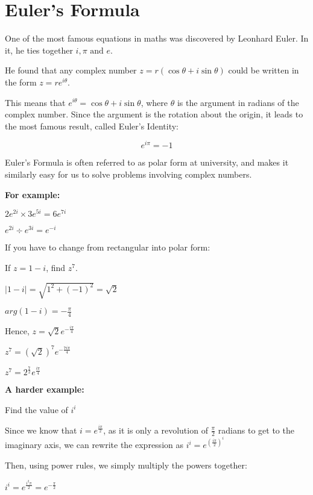 \documentclass[../main.tex]{subfiles}
\begin{document}
\section{Euler's Formula}
One of the most famous equations in maths was discovered by Leonhard Euler. In it, he ties together \(i,\pi \text{ and } e\).

He found that any complex number \(z=r(\cos{\theta}+i\sin{\theta})\) could be written in the form \(z=re^{i\theta}\).

This means that \(e^{i\theta}=\cos{\theta}+i\sin{\theta}\), where \(\theta\) is the argument in radians of the complex number. Since the argument is the rotation about the origin, it leads to the most famous result, called Euler's Identity:

\[e^{i\pi}=-1\]

Euler's Formula is often referred to as polar form at university, and makes it similarly easy for us to solve problems involving complex numbers.

\textbf{For example:}

\(2e^{2i} \times 3e^{5i}=6e^{7i}\)

\(e^{2i} \div e^{3i}=e^{-i}\)

If you have to change from rectangular into polar form:

If \(z=1-i\), find \(z^7\).

\(|1-i|=\sqrt{1^2+(-1)^2}=\sqrt{2}\)

\(arg(1-i)=-\frac{\pi}{4}\)

Hence, \(z=\sqrt{2}e^{-\frac{i\pi }{4}}\)

\(z^7=(\sqrt{2})^7 e^{-\frac{7i\pi}{4}}\)

\(z^7=2^{\frac{7}{2}}e^{\frac{i\pi}{4}}\)

\textbf{A harder example:}

Find the value of \(i^i\)

Since we know that \(i=e^{\frac{i\pi}{2}}\), as it is only a revolution of \(\frac{\pi}{2}\) radians to get to the imaginary axis, we can rewrite the expression as \(i^i=e^{(\frac{i\pi}{2})^{i}}\)

Then, using power rules, we simply multiply the powers together:

\(i^i=e^{\frac{i^2\pi}{2}}=e^{-\frac{\pi}{2}}\)


\pagebreak
\end{document}
